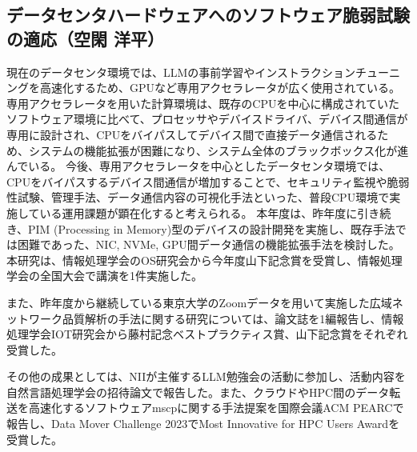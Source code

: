 \subsection{データセンタハードウェアへのソフトウェア脆弱試験の適応（空閑 洋平）}

現在のデータセンタ環境では、LLMの事前学習やインストラクションチューニングを高速化するため、GPUなど専用アクセラレータが広く使用されている。
専用アクセラレータを用いた計算環境は、既存のCPUを中心に構成されていたソフトウェア環境に比べて、プロセッサやデバイスドライバ、デバイス間通信が専用に設計され、CPUをバイパスしてデバイス間で直接データ通信されるため、システムの機能拡張が困難になり、システム全体のブラックボックス化が進んでいる。
今後、専用アクセラレータを中心としたデータセンタ環境では、CPUをバイパスするデバイス間通信が増加することで、セキュリティ監視や脆弱性試験、管理手法、データ通信内容の可視化手法といった、普段CPU環境で実施している運用課題が顕在化すると考えられる。
本年度は、昨年度に引き続き、PIM (Processing in Memory)型のデバイスの設計開発を実施し、既存手法では困難であった、NIC, NVMe, GPU間データ通信の機能拡張手法を検討した。本研究は、情報処理学会のOS研究会から今年度山下記念賞を受賞し、情報処理学会の全国大会で講演を1件実施した\cite{ykuga45871732, ykuga43010880}。

また、昨年度から継続している東京大学のZoomデータを用いて実施した広域ネットワーク品質解析の手法に関する研究については、論文誌を1編報告し、情報処理学会IOT研究会から藤村記念ベストプラクティス賞、山下記念賞をそれぞれ受賞した\cite{ykuga45871761, ykuga43010877, ykuga43010874}。

その他の成果としては、NIIが主催するLLM勉強会の活動に参加し、活動内容を自然言語処理学会の招待論文で報告した\cite{ykuga45871752}。また、クラウドやHPC間のデータ転送を高速化するソフトウェアmscpに関する手法提案を国際会議ACM PEARCで報告し、Data Mover Challenge 2023でMost Innovative for HPC Users Awardを受賞した\cite{ykuga43404131, ykuga9999}。
